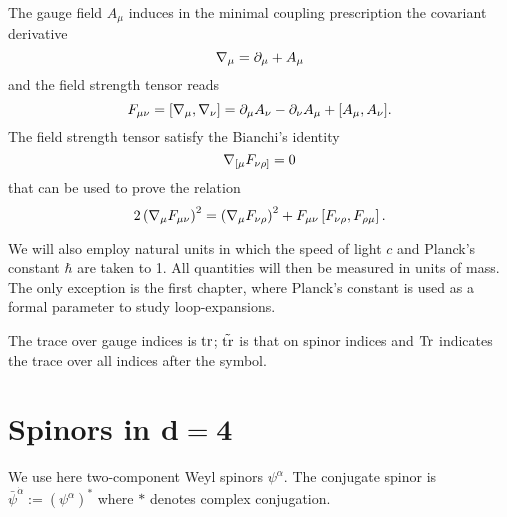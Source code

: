 The gauge field $A_\mu$ induces in the minimal coupling prescription the covariant derivative
\begin{equation}
{ \mathcal{\nabla} }_\mu = \partial_\mu + A_\mu
\end{equation}
and the field strength tensor reads
\begin{equation}
F_{\mu\nu} = [{ \mathcal{\nabla} }_\mu, { \mathcal{\nabla} }_\nu]
= \partial_\mu A_\nu - \partial_\nu A_\mu + [A_\mu , A_\nu ].
\end{equation}
The field strength tensor satisfy the Bianchi's identity
\begin{equation}
{ \mathcal{\nabla} }_{[\mu} F_{\nu\rho]} = 0
\end{equation}
that can be used to prove the relation
\begin{equation}\label{CovDF-dentity}
2 \left( { \mathcal{\nabla} }_\mu F_{\mu\nu} \right)^2 
	=
\left( { \mathcal{\nabla} }_\mu F_{\nu\rho} \right)^2 
+ F_{\mu\nu} \left[ F_{ \nu \rho } , F_{ \rho \mu } \right].
\end{equation}




We will also employ natural units in which the speed of light $c$ and Planck's constant $\hbar$ are taken to 1. All quantities will then be measured in units of mass. The only exception is the first chapter, where Planck's constant is used as a formal parameter to study loop-expansions.



The trace over gauge indices is $\operatorname{tr}$; $\tilde {\operatorname{tr}}$ is that on spinor indices and $\operatorname{Tr}$ indicates the trace over all indices after the symbol.





\section[Spinors in \texorpdfstring{${d=4}$}{{{d=4}}} ]{Spinors in \texorpdfstring{$\boldsymbol{d=4}$}{{{d=4}}} }


We use here two-component Weyl spinors $\psi^\alpha$.
The conjugate spinor is \( \bar \psi^{\dot \alpha} := (\psi^\alpha)^* \) where \(*\) denotes complex conjugation.

